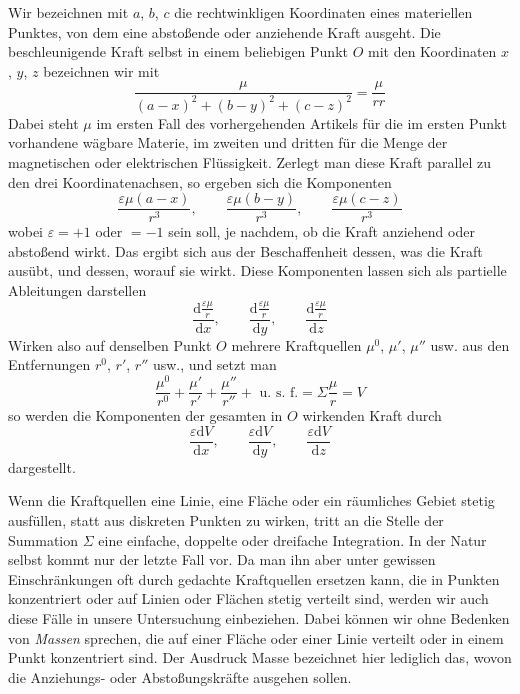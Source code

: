Wir bezeichnen mit $a$, $b$, $c$ die rechtwinkligen Koordinaten eines materiellen Punktes, von dem eine abstoßende oder anziehende Kraft ausgeht. Die beschleunigende Kraft selbst in einem beliebigen Punkt $O$ mit den Koordinaten $x$, $y$, $z$ bezeichnen wir mit
\[
\frac{\mu}{(a-x)^2+(b-y)^2+(c-z)^2}=\frac{\mu}{rr}
\]
Dabei steht $\mu$ im ersten Fall des vorhergehenden Artikels für die im ersten Punkt
vorhandene wägbare Materie, im zweiten und dritten für die Menge der magnetischen oder elektrischen Flüssigkeit. Zerlegt man diese Kraft parallel zu den drei Koordinatenachsen, so ergeben sich die Komponenten
\[
\frac{\varepsilon\mu(a-x)}{r^3},\qquad \frac{\varepsilon\mu(b-y)}{r^3},\qquad \frac{\varepsilon\mu(c-z)}{r^3}
\]
wobei $\varepsilon=+1$ oder $=-1$ sein soll, je nachdem, ob die Kraft anziehend oder abstoßend wirkt. Das ergibt sich aus der Beschaffenheit dessen, was die Kraft ausübt, und dessen, worauf sie wirkt. Diese Komponenten lassen sich als partielle Ableitungen darstellen
\[
\frac{\mathrm{d}\frac{\varepsilon\mu}{r}}{\mathrm{d}x},\qquad \frac{\mathrm{d}\frac{\varepsilon\mu}{r}}{\mathrm{d}y},\qquad \frac{\mathrm{d}\frac{\varepsilon\mu}{r}}{\mathrm{d}z}
\]
Wirken also auf denselben Punkt $O$ mehrere Kraftquellen $\mu^0$, $\mu'$, $\mu''$ usw. aus den Entfernungen $r^0$, $r'$, $r''$ usw., und setzt man
\[
\frac{\mu^0}{r^0}+\frac{\mu'}{r'}+\frac{\mu''}{r''}+\text{ u. s. f.}=\Sigma\frac{\mu}{r}=V
\]
so werden die Komponenten der gesamten in $O$ wirkenden Kraft durch
\[
\frac{\varepsilon\mathrm{d}V}{\mathrm{d}x},\qquad \frac{\varepsilon\mathrm{d}V}{\mathrm{d}y},\qquad \frac{\varepsilon\mathrm{d}V}{\mathrm{d}z}
\]
dargestellt.

Wenn die Kraftquellen eine Linie, eine Fläche oder ein räumliches Gebiet stetig ausfüllen, statt aus diskreten Punkten zu wirken, tritt an die Stelle der Summation $\Sigma$ eine einfache, doppelte oder dreifache Integration. In der Natur selbst kommt nur der letzte Fall vor. Da man ihn aber unter gewissen Einschränkungen oft durch gedachte Kraftquellen ersetzen kann, die in Punkten konzentriert oder auf Linien oder Flächen stetig verteilt sind, werden wir auch diese Fälle in unsere Untersuchung einbeziehen. Dabei können wir ohne Bedenken von \textit{Massen} sprechen, die auf einer Fläche oder einer Linie verteilt oder in einem Punkt konzentriert sind. Der Ausdruck Masse bezeichnet hier lediglich das, wovon die Anziehungs- oder Abstoßungskräfte ausgehen sollen.

